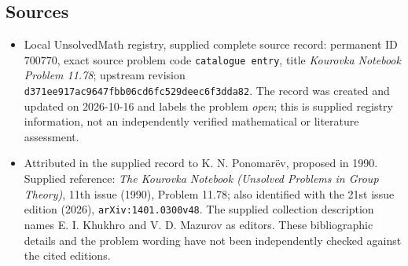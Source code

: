 \documentclass[11pt]{article}
\begin{document}
\subsection{Sources}
\begin{itemize}
\item Local UnsolvedMath registry, supplied complete source record: permanent ID \(700770\), exact source problem code \texttt{catalogue entry}, title \emph{Kourovka Notebook Problem 11.78}; upstream revision \texttt{d371ee917ac9647fbb06cd6fc529deec6f3dda82}. The record was created and updated on 2026-10-16 and labels the problem \emph{open}; this is supplied registry information, not an independently verified mathematical or literature assessment.
\item Attributed in the supplied record to K. N. Ponomar\"ev, proposed in 1990. Supplied reference: \emph{The Kourovka Notebook (Unsolved Problems in Group Theory)}, 11th issue (1990), Problem 11.78; also identified with the 21st issue edition (2026), \texttt{arXiv:1401.0300v48}. The supplied collection description names E. I. Khukhro and V. D. Mazurov as editors. These bibliographic details and the problem wording have not been independently checked against the cited editions.
\end{itemize}
\end{document}
